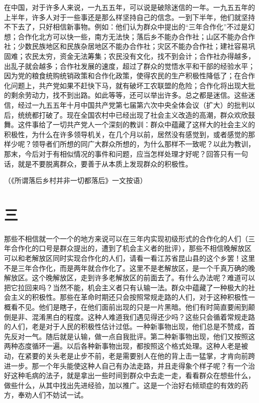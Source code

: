 在中国，对于许多人来说，一九五五年，可以说是破除迷信的一年。一九五五年的上半年，许多人对于一些事还是那么样坚持自己的信念。一到下半年，他们就坚持不下去了，只好相信新事物。例如：他们认为群众中提出的“三年合作化”不过是幻想；合作化北方可以快一些，南方无法快；落后乡不能办合作社；山区不能办合作社；少数民族地区和民族杂居地区不能办合作社；灾区不能办合作社；建社容易巩固难；农民太穷，资金无法筹集；农民没有文化，找不到会计；合作社办得越多，出乱子就会越多；合作社发展的速度，超过了群众的觉悟水平和干部的经验水平；因为党的粮食统购统销政策和合作化政策，使得农民的生产积极性降低了；在合作化问题上，共产党如果不赶快下马，就有破坏工农联盟的危险；合作化将出现大批的剩余劳动力，找不到出路。如此等等，还可以举出许多。总之都是迷信。这些迷信，经过一九五五年十月中国共产党第七届第六次中央全体会议（扩大）的批判以后，统统都打破了。现在全国农村中已经出现了社会主义改造的高潮，群众欢欣鼓舞。这件事给了一切共产党人一个深刻的教训：群众中蕴藏了这样大的社会主义的积极性，为什么在许多领导机关，在几个月以前，居然没有感觉到，或者感觉的那样少呢？领导者们所想的同广大群众所想的，为什么那样不一致呢？以此为教训，那末，今后对于有相似情况的事件和问题，应当怎样处理才好呢？回答只有一句话，就是不要脱离群众，要善于从本质上发现群众的积极性。


（《所谓落后乡村并非一切都落后》一文按语）

\section*{三}

那些不相信就一个一个的地方来说可以在三年内实现初级形式的合作化的人们（三年合作化的口号是群众提出的，遭到了机会主义者的批评），那些不相信晚解放区可以和老解放区同时实现合作化的人们，请看一看江苏省昆山县的这个乡罢！这里不是三年合作化，而是两年就合作化了。这里不是老解放区，是一个千真万确的晚解放区。这个晚解放区，走到许多老解放区的前面去了。有什么办法呢？难道可以把它拉回来吗？当然不能，机会主义者只有认输一法。群众中蕴藏了一种极大的社会主义的积极性。那些在革命时期还只会按照常规走路的人们，对于这种积极性一概看不见。他们是瞎子，在他们面前出现的只是一片黑暗。他们有时简直要闹到颠倒是非、混淆黑白的程度。这种人难道我们遇见得还少吗？这些只会循着常规走路的人们，老是对于人民的积极性估计过低。一种新事物出现，他们总是不赞成，首先反对一气。随后就是认输，做一点自我批评。第二种新事物出现，他们又按照这两种态度循环一遍。以后各种新事物出现，都按照这个格式处理。这种人老是被动，在紧要的关头老是止步不前，老是需要别人在他的背上击一猛掌，才肯向前跨进一步。那一个年头能使这种人自己有办法走路，并且走得象个样子呢？有一个治好这种毛病的法子，就是拿出一些时间到群众中去走一走，看看群众在想些什么，做些什么，从其中找出先进经验，加以推广。这是一个治好右倾顽症的有效的药方，奉劝人们不妨试一试。


